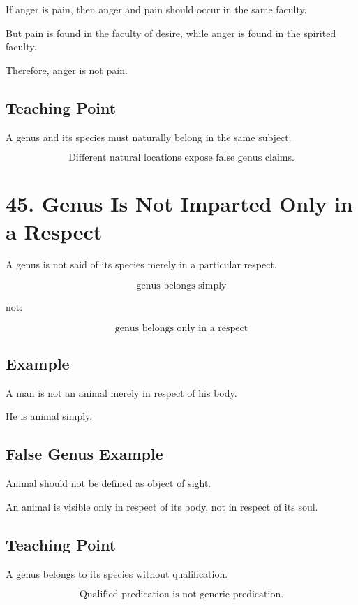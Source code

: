 \documentclass[12pt]{article}
\begin{document}
If anger is pain, then anger and pain should occur in the same faculty.

But pain is found in the faculty of desire, while anger is found in the spirited
faculty.

Therefore, anger is not pain.

\subsection*{Teaching Point}

A genus and its species must naturally belong in the same subject.

\[
\boxed{
\text{Different natural locations expose false genus claims.}
}
\]

\section*{45. Genus Is Not Imparted Only in a Respect}

A genus is not said of its species merely in a particular respect.

\[
\text{genus belongs simply}
\]

not:

\[
\text{genus belongs only in a respect}
\]

\subsection*{Example}

A man is not an animal merely in respect of his body.

He is animal simply.

\subsection*{False Genus Example}

Animal should not be defined as object of sight.

An animal is visible only in respect of its body, not in respect of its soul.

\subsection*{Teaching Point}

A genus belongs to its species without qualification.

\[
\boxed{
\text{Qualified predication is not generic predication.}
}
\]
\end{document}
